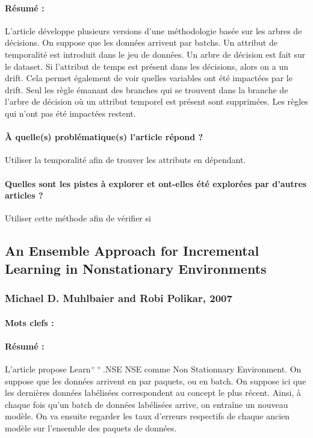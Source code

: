 \documentclass[11pt,a4paper]{report}
\begin{document}
\paragraph{Résumé :} L'article développe plusieurs versions d'une méthodologie basée sur les arbres de décisions.  On suppose que les données arrivent par batchs. Un attribut de temporalité est introduit dans le jeu de données. Un arbre de décision est fait sur le dataset. Si l’attribut de temps est présent dans les décisions, alors on a un drift. Cela permet également de voir quelles variables ont été impactées par le drift. Seul les règle émanant des branches qui se trouvent dans la branche de l’arbre de décision où un attribut temporel est présent sont supprimées. Les règles qui n’ont pas été impactées restent.

\paragraph{À quelle(s) problématique(s) l'article répond ?} Utiliser la temporalité afin de trouver les attributs en dépendant.

\paragraph{Quelles sont les pistes à explorer et ont-elles  été explorées par d'autres articles ?} Utiliser cette méthode afin de vérifier si 



\subsection{An Ensemble Approach for Incremental Learning in Nonstationary Environments}
\subsubsection{Michael D. Muhlbaier and Robi Polikar, 2007}

\paragraph{Mots clefs :} 

\paragraph{Résumé :} L'article propose Learn$^{++}$.NSE NSE comme Non Stationnary Environment. On suppose que les données arrivent en par paquets, ou en batch. On suppose ici que les dernières données labélisées correspondent au concept le plus récent. Ainsi, à chaque fois qu'un batch de données labélisées arrive, on entraîne un nouveau modèle. On va ensuite regarder les taux d'erreurs respectifs de chaque ancien modèle sur l'ensemble des paquets de données. 
\end{document}
